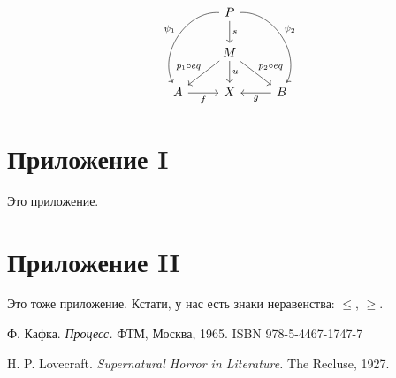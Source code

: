 \documentclass[a4paper,12pt]{article}
\let\leq\leqslant
\let\geq\geqslant
\begin{document}
$$
\begin{tikzcd}
& \arrow[bend right=60, swap]{ddl}{\psi_1} P \arrow{d}{s} \arrow[bend left=60]{ddr}{\psi_2}& \\
& \arrow[swap]{ld}{p_1 \circ eq} M \arrow{d}{u} \arrow{rd}{p_2 \circ eq}& \\
A \arrow[swap]{r}{f} & X & \arrow{l}{g} B
\end{tikzcd}
$$

\appendixpage \addappheadtotoc

\begin{appendices}

\section{Приложение I}

Это приложение.

\section{Приложение II}

Это тоже приложение. Кстати, у нас есть знаки
неравенства: $\leq$, $\geq$.

\end{appendices}

\renewcommand\refname{Библиография}

\begin{thebibliography}{}

 Ф. Кафка. \textit{Процесс.} ФТМ, Москва, 1965. ISBN 978-5-4467-1747-7

 H. P. Lovecraft. \textit{Supernatural Horror in Literature.} The Recluse, 1927.

\end{thebibliography}
\end{document}
